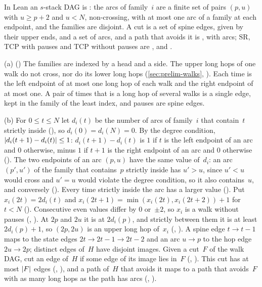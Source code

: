 \begin{outline}
In Lean an $s$-stack DAG is : the arcs of family~$i$ are a finite set of pairs $(p,u)$ with $u\ge p+2$ and
$u<N$, non-crossing, with at most one arc of a family at each endpoint, and the families are disjoint. A cut is a set of
spine edges, given by their upper ends, and a set of arcs, and a path that avoids it is , with
 arcs; $\mathrm{SR}$, TCP with pauses and TCP without pauses are ,  and .

(a) () The families are indexed by a head and a side. The upper long hops of one walk do not
cross, nor do its lower long hops (\cref{sec:prelim-walks}, ). Each time is the left endpoint of at most
one long hop of each walk and the right endpoint of at most one. A pair of times that is a long hop of several walks is a
single edge, kept in the family of the least index, and pauses are spine edges.

(b) For $0\le t\le N$ let $d_i(t)$ be the number of arcs of family~$i$ that contain~$t$ strictly inside
(), so $d_i(0)=d_i(N)=0$. By the degree condition, $\lvert d_i(t+1)-d_i(t) \rvert\le1$: $d_i(t+1)-d_i(t)$ is $1$
if $t$ is the left endpoint of an arc and $0$ otherwise, minus $1$ if $t+1$ is the right endpoint of an arc and $0$
otherwise (). The two endpoints of an arc $(p,u)$ have the same value of~$d_i$: an arc $(p',u')$
of the family that contains~$p$ strictly inside has $u'>u$, since $u'<u$ would cross and $u'=u$ would violate the degree
condition, so it also contains~$u$, and conversely (). Every time strictly inside the arc has
a larger value (). Put $x_i(2t)=2d_i(t)$ and $x_i(2t+1)=\min(x_i(2t),x_i(2t+2))+1$ for $t<N$
(). Consecutive even values differ by $0$ or~$\pm2$, so $x_i$ is a walk without pauses
(, ). At $2p$ and $2u$ it is at $2d_i(p)$, and strictly between
them it is at least $2d_i(p)+1$, so $(2p,2u)$ is an upper long hop of~$x_i$ (,
). A spine edge $t\to t-1$ maps to the state edges $2t\to2t-1\to2t-2$ and an arc $u\to p$ to the
hop edge $2u\to2p$; distinct edges of~$H$ have disjoint images. Given a cut~$F$ of the walk DAG, cut an edge of~$H$ if some
edge of its image lies in~$F$ (, ). This cut has at most $\lvert F \rvert$ edges
(, ), and a path of~$H$ that avoids it maps to a path that avoids~$F$ with as many long hops as the path has arcs
(, ).


\end{outline}

